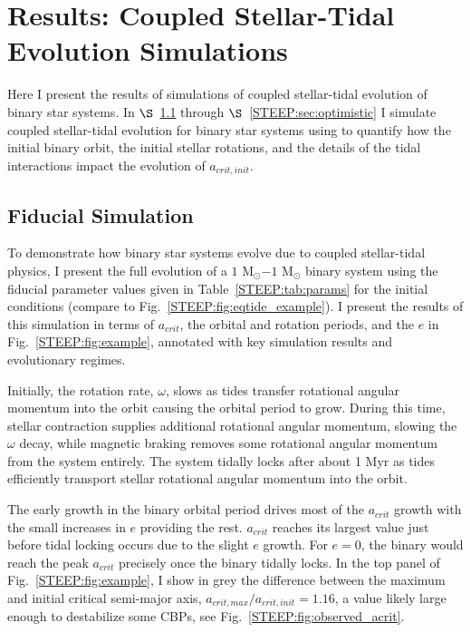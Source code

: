 \section{Results: Coupled Stellar-Tidal Evolution Simulations} \label{STEEP:sec:results}

Here I present the results of simulations of coupled stellar-tidal evolution of binary star systems.  In $\S$~\ref{STEEP:sec:fiducial_simulation} through $\S$~\ref{STEEP:sec:optimistic} I simulate coupled stellar-tidal evolution for binary star systems using \vplanet to quantify how the initial binary orbit, the initial stellar rotations, and the details of the tidal interactions impact the evolution of $a_{crit,init}$.

\subsection{Fiducial Simulation} \label{STEEP:sec:fiducial_simulation}

To demonstrate how binary star systems evolve due to coupled stellar-tidal physics, I present the full evolution of a $1$ M$_{\odot}$$-1$ M$_{\odot}$ binary system using the fiducial parameter values given in Table~\ref{STEEP:tab:params} for the initial conditions (compare to Fig.~\ref{STEEP:fig:eqtide_example}).  I present the results of this simulation in terms of $a_{crit}$, the orbital and rotation periods, and the $e$ in Fig.~\ref{STEEP:fig:example}, annotated with key simulation results and evolutionary regimes.

Initially,  the rotation rate, $\omega$, slows as tides transfer rotational angular momentum into the orbit causing the orbital period to grow.  During this time, stellar contraction supplies additional rotational angular momentum, slowing the $\omega$ decay, while magnetic braking removes some rotational angular momentum from the system entirely.  The system tidally locks after about 1 Myr as tides efficiently transport stellar rotational angular momentum into the orbit.

The early growth in the binary orbital period drives most of the $a_{crit}$ growth with the small increases in $e$ providing the rest.  $a_{crit}$ reaches its largest value just before tidal locking occurs due to the slight $e$ growth.  For $e=0$, the binary would reach the peak $a_{crit}$ precisely once the binary tidally locks.  In the top panel of Fig.~\ref{STEEP:fig:example}, I show in grey the difference between the maximum and initial critical semi-major axis, $a_{crit,max}/a_{crit,init} = 1.16$, a value likely large enough to destabilize some CBPs, see Fig.~\ref{STEEP:fig:observed_acrit}.  

